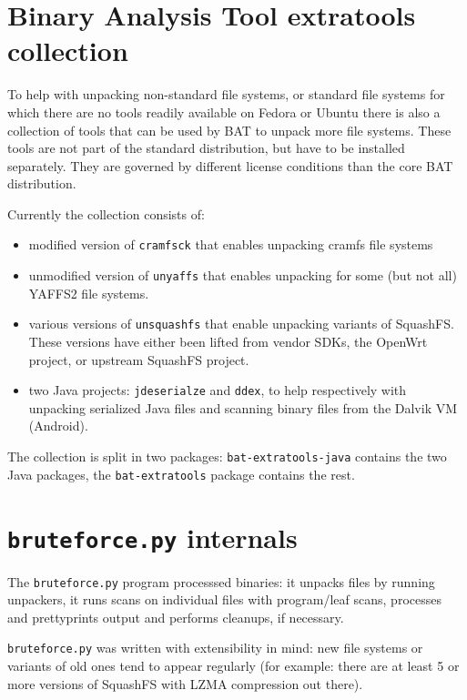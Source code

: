 \documentclass[10pt]{article}
\begin{document}
\section{Binary Analysis Tool extratools collection}

To help with unpacking non-standard file systems, or standard file systems for
which there are no tools readily available on Fedora or Ubuntu there is also
a collection of tools that can be used by BAT to unpack more file systems.
These tools are not part of the standard distribution, but have to be installed
separately. They are governed by different license conditions than the core BAT
distribution.

Currently the collection consists of:

\begin{itemize}
\item modified version of \texttt{cramfsck} that enables unpacking cramfs
file systems
\item unmodified version of \texttt{unyaffs} that enables unpacking for some
(but not all) YAFFS2 file systems.
\item various versions of \texttt{unsquashfs} that enable unpacking variants
of SquashFS. These versions have either been lifted from vendor SDKs, the
OpenWrt project, or upstream SquashFS project.
\item two Java projects: \texttt{jdeserialze} and \texttt{ddex}, to help
respectively with unpacking serialized Java files and scanning binary files
from the Dalvik VM (Android).
\end{itemize}

The collection is split in two packages: \texttt{bat-extratools-java} contains
the two Java packages, the \texttt{bat-extratools} package contains the rest.

\appendix

\section{\texttt{bruteforce.py} internals}

The \texttt{bruteforce.py} program processsed binaries: it unpacks files by
running unpackers, it runs scans on individual files with program/leaf
scans, processes and prettyprints output and performs cleanups, if necessary.

\texttt{bruteforce.py} was written with extensibility in mind: new file systems
or variants of old ones tend to appear regularly (for example: there are at
least 5 or more versions of SquashFS with LZMA compression out there).
\end{document}

